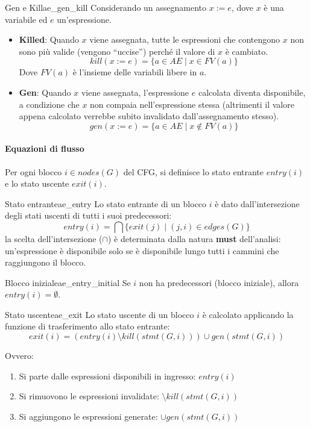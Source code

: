 \begin{definizione}{Gen e Kill}{ae_gen_kill}
Considerando un assegnamento $x := e$, dove $x$ è una variabile ed $e$
un'espressione.
\begin{itemize}
    \item \textbf{Killed}: Quando $x$ viene assegnata, tutte le espressioni
    che contengono $x$ non sono più valide (vengono ``uccise'') perché il
    valore di $x$ è cambiato.
    \[ kill(x := e) = \{ a \in AE \mid x \in FV(a) \} \]
    Dove $FV(a)$ è l'insieme delle variabili libere in $a$.
    
    \item \textbf{Gen}: Quando $x$ viene assegnata, l'espressione
    $e$ calcolata diventa disponibile, a condizione che $x$ non compaia
    nell'espressione stessa (altrimenti il valore appena calcolato verrebbe
    subito invalidato dall'assegnamento stesso).
    \[ gen(x := e) = \{ a \in AE \mid x \notin FV(a) \} \]
\end{itemize}
\end{definizione}

\paragraph{Equazioni di flusso}


Per ogni blocco $i \in nodes(G)$ del CFG, si definisce lo stato entrante
$entry(i)$ e lo stato uscente $exit(i)$.

\begin{definizione}{Stato entrante}{ae_entry}
Lo stato entrante di un blocco $i$ è dato dall'intersezione degli stati
uscenti di tutti i suoi predecessori:
\[
entry(i) = \bigcap \{exit(j) \mid (j, i) \in edges(G)\}
\]
la scelta dell'intersezione ($\cap$) è determinata dalla natura \textbf{must}
dell'analisi: un'espressione è disponibile solo se è disponibile lungo tutti
i cammini che raggiungono il blocco.

\end{definizione}

\begin {nota}{Blocco iniziale}{ae_entry_initial}
Se $i$ non ha predecessori (blocco iniziale), allora $entry(i) = \emptyset$.
\end{nota}

\begin{definizione}{Stato uscente}{ae_exit}
Lo stato uscente di un blocco $i$ è calcolato applicando la funzione di
trasferimento allo stato entrante:
\[
exit(i) = (entry(i) \setminus kill(stmt(G, i))) \cup gen(stmt(G, i))
\]

Ovvero:
\begin{enumerate}
    \item Si parte dalle espressioni disponibili in ingresso: $entry(i)$
    \item Si rimuovono le espressioni invalidate: $\setminus kill(stmt(G, i))$
    \item Si aggiungono le espressioni generate: $\cup gen(stmt(G, i))$
\end{enumerate}
\end{definizione}


